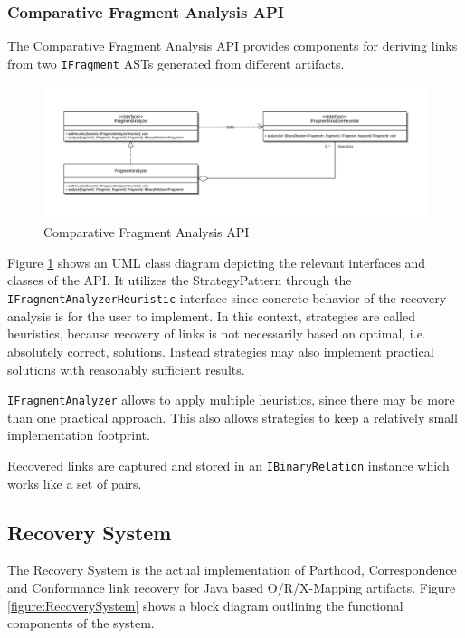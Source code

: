 \subsubsection{Comparative Fragment Analysis API}
\label{subsubsection:ComparativeFragmentAnalysisAPI}
The Comparative Fragment Analysis \gls{API} provides components for deriving links from two \texttt{IFragment} \glspl{AST} generated from different artifacts.
\begin{figure}[h!]
\begin{center}
\includegraphics[width=\textwidth]{images/ComparativeFragmentAnalysisAPI.png}
\end{center}
\caption{Comparative Fragment Analysis API}
\label{figure:ComparativeFragmentAnalysisAPI}
\end{figure}
Figure \ref{figure:ComparativeFragmentAnalysisAPI} shows an \gls{UML} class diagram depicting the relevant interfaces and classes of the \gls{API}.
It utilizes the \gls{StrategyPattern} through the \texttt{IFragmentAnalyzerHeuristic} interface since concrete behavior of the recovery analysis is for the user to implement.
In this context, strategies are called heuristics, because recovery of links is not necessarily based on optimal, i.e. absolutely correct, solutions.
Instead strategies may also implement practical solutions with reasonably sufficient results.

\texttt{IFragmentAnalyzer} allows to apply multiple heuristics, since there may be more than one practical approach. This also allows strategies to keep a relatively small implementation footprint.

Recovered links are captured and stored in an \texttt{IBinaryRelation} instance which works like a set of pairs.

\subsection{Recovery System}
\label{subsection:RecoverySystem}
The Recovery System is the actual implementation of \gls{Parthood}, \gls{Correspondence} and \gls{Conformance} link recovery for Java based \gls{O/R/X-Mapping} artifacts.
Figure \ref{figure:RecoverySystem} shows a block diagram outlining the functional components of the system.

